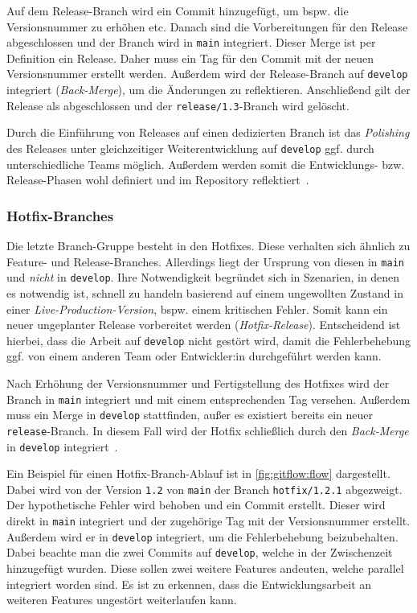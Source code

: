 Auf dem Release\hyp Branch wird ein Commit hinzugefügt, um bspw. die Versionsnummer zu erhöhen etc. Danach sind die Vorbereitungen für den Release abgeschlossen und der Branch wird in \texttt{main} integriert. Dieser Merge ist per Definition ein Release. Daher muss ein Tag für den Commit mit der neuen Versionsnummer erstellt werden. Außerdem wird der Release\hyp Branch auf \texttt{develop} integriert (\emph{Back\hyp Merge}), um die Änderungen zu reflektieren. Anschließend gilt der Release als abgeschlossen und der \texttt{release/1.3}-Branch wird gelöscht.

Durch die Einführung von Releases auf einen dedizierten Branch ist das \emph{Polishing} des Releases unter gleichzeitiger Weiterentwicklung auf \texttt{develop} ggf. durch unterschiedliche Teams möglich. Außerdem werden somit die Entwicklungs- bzw. Release\hyp Phasen wohl definiert und im Repository reflektiert~\cite{atlassianGitflowWorkflow}.


\subsubsection{Hotfix-Branches}

Die letzte Branch-Gruppe besteht in den Hotfixes. Diese verhalten sich ähnlich zu Feature- und Release\hyp Branches. Allerdings liegt der Ursprung von diesen in \texttt{main} und \emph{nicht} in \texttt{develop}. Ihre Notwendigkeit begründet sich in Szenarien, in denen es notwendig ist, schnell zu handeln basierend auf einem ungewollten Zustand in einer \emph{Live-Production-Version}, bspw. einem kritischen Fehler. Somit kann ein neuer ungeplanter Release vorbereitet werden (\emph{Hotfix-Release}). Entscheidend ist hierbei, dass die Arbeit auf \texttt{develop} nicht gestört wird, damit die Fehlerbehebung ggf. von einem anderen Team oder Entwickler:in durchgeführt werden kann.

Nach Erhöhung der Versionsnummer und Fertigstellung des Hotfixes wird der Branch in \texttt{main} integriert und mit einem entsprechenden Tag versehen. Außerdem muss ein Merge in \texttt{develop} stattfinden, außer es existiert bereits ein neuer \texttt{release}-Branch. In diesem Fall wird der Hotfix schließlich durch den \emph{Back-Merge} in \texttt{develop} integriert~\cite{driessenSuccessfulGitBranching2010}.

Ein Beispiel für einen Hotfix\hyp Branch\hyp Ablauf ist in \autoref{fig:gitflow:flow} dargestellt. Dabei wird von der Version \verb|1.2| von \texttt{main} der Branch \texttt{hotfix/1.2.1} abgezweigt. Der hypothetische Fehler wird behoben und ein Commit erstellt. Dieser wird direkt in \texttt{main} integriert und der zugehörige Tag mit der Versionsnummer erstellt. Außerdem wird er in \texttt{develop} integriert, um die Fehlerbehebung beizubehalten. Dabei beachte man die zwei Commits auf \texttt{develop}, welche in der Zwischenzeit hinzugefügt wurden. Diese sollen zwei weitere Features andeuten, welche parallel integriert worden sind. Es ist zu erkennen, dass die Entwicklungsarbeit an weiteren Features ungestört weiterlaufen kann.


